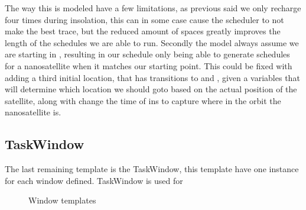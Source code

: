 The way this is modeled have a few limitations, as previous said we only recharge four times during insolation, this can in some case cause the scheduler to not make the best trace, but the reduced amount of spaces greatly improves the length of the schedules we are able to run. Secondly the model always assume we are starting in , resulting in our schedule only being able to generate schedules for a nanosatellite when it matches our starting point. This could be fixed with adding a third initial location, that has transitions to  and , given a variables that will determine which location we should goto based on the actual position of the satellite, along with change the time of ins to capture where in the orbit the nanosatellite is. 


\subsection*{TaskWindow}
The last remaining template is the TaskWindow, this template have one instance for each window defined. TaskWindow is used for 
\begin{figure}[H]
	\centering
	\caption{Window templates}
	\label{fig:cora_window}
\end{figure}

